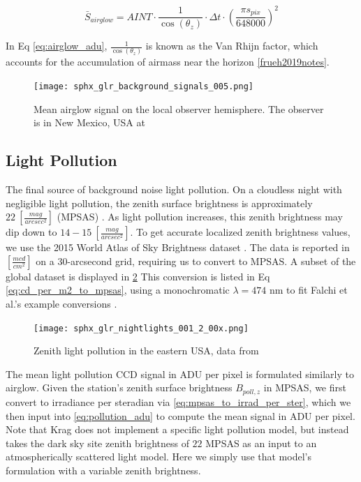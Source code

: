 \begin{equation} \label{eq:airglow_adu}
  \bar{S}_{airglow} = AINT \cdot \frac{1}{\cos(\theta_z)} \cdot \Delta t \cdot \left( \frac{\pi s_{pix}}{648000} \right)^2
\end{equation}

In Eq \ref{eq:airglow_adu}, $\frac{1}{\cos(\theta_z)}$ is known as the Van Rhijn factor, which
accounts for the accumulation of airmass near the horizon \ref{frueh2019notes}.

\begin{figure}[ht]
  \centering
  \texttt{[image: sphx\_glr\_background\_signals\_005.png]}
  \caption{Mean airglow signal on the local observer hemisphere. The observer is in New Mexico, USA at
  \pogslla}
  \label{fig:airglowhemi}
\end{figure}

\subsection{Light Pollution}

The final source of background noise light pollution. On a cloudless night with negligible light
pollution, the zenith surface brightness is approximately $22 \: \left[ \frac{mag}{arcsec^2}
\right]$ (MPSAS) \cite{krag2003}. As light pollution increases, this zenith brightness may dip down to
$14-15 \: \left[ \frac{mag}{arcsec^2} \right]$. To get accurate localized zenith brightness values,
we use the 2015 World Atlas of Sky Brightness dataset \cite{falchi2016_data}. The data is reported in $\left[
	\frac{mcd}{cm^2} \right]$ on a 30-arcsecond grid, requiring us to convert to MPSAS. A subset of the global dataset is displayed in \ref{fig:pollution_data} This conversion is listed in Eq \ref{eq:cd_per_m2_to_mpsas}, using a monochromatic $\lambda = 474$ nm to fit Falchi et al.'s example conversions \cite{falchi2016}.  

\begin{figure}[ht]
  \centering
  \texttt{[image: sphx\_glr\_nightlights\_001\_2\_00x.png]}
  \caption{Zenith light pollution in the eastern USA, data from \cite{falchi2016_data}}
  \label{fig:pollution_data}
\end{figure}

The mean light pollution CCD signal in ADU per pixel is formulated similarly to airglow. Given the station's zenith surface brightness $B_{poll,z}$ in MPSAS, we first convert to irradiance per steradian via \ref{eq:mpsas_to_irrad_per_ster}, which we then input into \ref{eq:pollution_adu} to compute the mean signal in ADU per pixel. Note that Krag does not implement a specific light pollution model, but instead takes the dark sky site zenith brightness of $22$ MPSAS as an input to an atmospherically scattered light model. Here we simply use that model's formulation with a variable zenith brightness.
 

